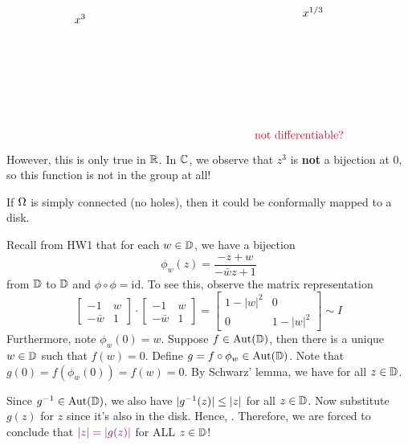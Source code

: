 \documentclass[12pt]{article}
\begin{document}
\begin{itemize}
\[\begin{tikzpicture}[x=0.75pt,y=0.75pt,yscale=-1,xscale=1]
        \draw (162,55.4) node [anchor=north west][inner sep=0.75pt]    {$x^{3}$};
        \draw (433,46.4) node [anchor=north west][inner sep=0.75pt]    {$x^{1/3}$};
        \draw (376,194) node [anchor=north west][inner sep=0.75pt]  [color={rgb, 255:red, 208; green, 2; blue, 27 }  ,opacity=1 ] [align=left] {not differentiable?};
        
        
        \end{tikzpicture}
        \]
        However, this is only true in $\mathbb{R}$. In $\mathbb{C}$, we observe that $z^3$ is \textbf{not} a bijection at $0$, so this function is not in the group at all!
\end{itemize}

\begin{theorem}
    If $\Omega$ is simply connected (no holes), then it could be conformally mapped to a disk.
\end{theorem}

\spl

Recall from HW1 that for each $w\in \mathbb{D}$, we have a bijection \[\phi_w(z)=\frac{-z+w}{-\bar w z+1}\] from $\mathbb{D}$ to $\mathbb{D}$ and $\phi\circ \phi=\mathrm{id}$. To see this, observe the matrix representation \[\begin{bmatrix}
    -1 & w\\ -\bar w & 1
\end{bmatrix}\cdot \begin{bmatrix}
    -1 & w\\ -\bar w & 1
\end{bmatrix} = \begin{bmatrix}
    1-|w|^2 & 0 \\ 0 &  1-|w|^2
\end{bmatrix}\sim I\]
Furthermore, note $\phi_w(0)=w$. Suppose $f\in \operatorname{Aut}(\mathbb{D})$, then there is a unique $w\in \mathbb{D}$ such that $f(w)=0$. Define $g=f\circ \phi_w\in \operatorname{Aut}(\mathbb{D})$. Note that $g(0)=f(\phi_w(0))=f(w)=0$. By Schwarz' lemma, we have  for all $z\in \mathbb{D}$. 

Since $g^{-1}\in \operatorname{Aut}(\mathbb{D})$, we also have $|g^{-1}(z)|\leq |z|$ for all $z\in \mathbb{D}$. Now substitute $g(z)$ for $z$ since it's also in the disk. Hence, . Therefore, we are forced to conclude that $\textcolor{violet}{|z|=|g(z)|}$ for ALL $z\in \mathbb{D}$!
\end{document}
